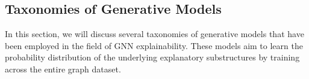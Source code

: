 




\subsection{Taxonomies of Generative Models}\label{sec:generative_model}
In this section, we will discuss several taxonomies of generative models that have been employed in the field of GNN explainability. These models aim to learn the probability distribution of the underlying explanatory substructures by training across the entire graph dataset.
